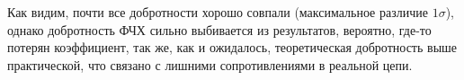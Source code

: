 \documentclass[a4paper,12pt]{extarticle}
\begin{document}
\begin{enumerate}
\begin{table}[h!]
\begin{tabular}{|l|lll|llll|}
\end{tabular}
\end{table}
    Как видим, почти все добротности хорошо совпали (максимальное различие $1 \sigma$), однако добротность ФЧХ сильно выбивается из результатов, вероятно, где-то потерян коэффициент, так же, как и ожидалось, теоретическая добротность выше практической, что связано с лишними сопротивлениями в реальной цепи.

\end{enumerate}
\end{document}
